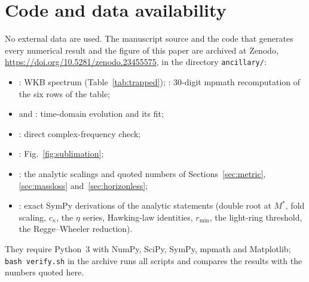 \documentclass[11pt]{article}
\begin{document}
\section*{Code and data availability}
No external data are used. The manuscript source and the code that generates every numerical result and the figure of this paper are archived at Zenodo, \url{https://doi.org/10.5281/zenodo.23455575}, in the directory \texttt{ancillary/}:
\begin{itemize}\setlength{\itemsep}{0pt}
\item {}: WKB spectrum (Table~\ref{tab:trapped}); : 30-digit mpmath recomputation of the six rows of the table;
\item {} and : time-domain evolution and its fit;
\item {}: direct complex-frequency check;
\item {}: Fig.~\ref{fig:sublimation};
\item {}: the analytic scalings and quoted numbers of Sections~\ref{sec:metric}, \ref{sec:massloss} and~\ref{sec:horizonless};
\item {}: exact SymPy derivations of the analytic statements (double root at $M^*$, fold scaling, $c_\kappa$, the $\eta$ series, Hawking-law identities, $r_{\min}$, the light-ring threshold, the Regge--Wheeler reduction).
\end{itemize}
They require Python~3 with NumPy, SciPy, SymPy, mpmath and Matplotlib; \texttt{bash verify.sh} in the archive runs all scripts and compares the results with the numbers quoted here.



\end{document}
